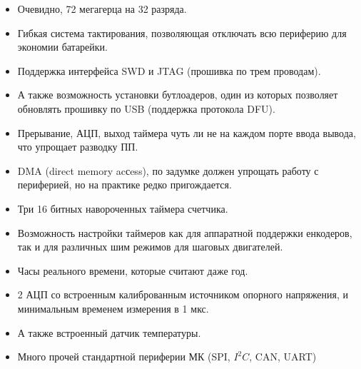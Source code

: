 \documentclass[12pt,a4paper]{article}
\begin{document}
\begin{itemize}
    \item Очевидно, 72 мегагерца на 32 разряда.
    \item Гибкая система тактирования, позволяющая отключать всю периферию
    для экономии батарейки.
    \item Поддержка интерфейса SWD и JTAG (прошивка по трем проводам).
    \item А также возможность установки бутлоадеров, один из которых позволяет
    обновлять прошивку по USB (поддержка протокола DFU).
    \item Прерывание, АЦП, выход таймера чуть ли не на каждом порте ввода вывода,
     что упрощает разводку ПП.
    \item DMA (direct memory acсess), по задумке должен упрощать работу с
    периферией, но на практике редко пригождается.
    \item Три 16 битных навороченных таймера счетчика.
    \item Возможность настройки таймеров как для аппаратной поддержки енкодеров,
    так и для различных шим режимов для шаговых двигателей.
    \item Часы реального времени, которые считают даже год.
    \item 2 АЦП со встроенным калиброванным источником опорного напряжения,
    и минимальным временем измерения в 1 мкс.
    \item А также встроенный датчик температуры.
    \item Много прочей стандартной периферии МК (SPI, $I^2C$, CAN, UART)
\end{itemize}
\end{document}
